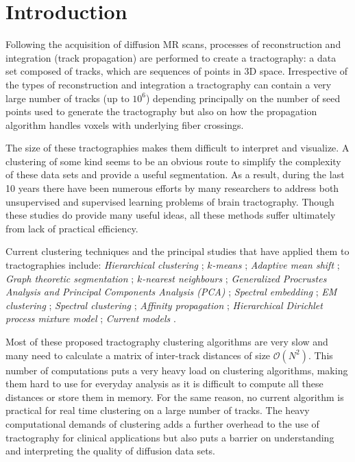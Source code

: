 \documentclass[journal]{IEEEtran}
\begin{document}
\section{Introduction}

Following the acquisition of diffusion MR scans, processes of
reconstruction and integration (track propagation) are performed to
create a tractography: a data set composed of tracks, which are
sequences of points in 3D space. Irrespective of the types of
reconstruction and integration a tractography can contain a very large
number of tracks (up to $10^6$) depending principally on the number of
seed points used to generate the tractography but also on how the
propagation algorithm handles voxels with underlying fiber crossings.

The size of these tractographies makes them difficult to interpret and
visualize. A clustering of some kind seems to be an obvious route to
simplify the complexity of these data sets and provide a useful
segmentation.  As a result, during the last 10 years there have been
numerous efforts by many researchers to address both unsupervised and
supervised learning problems of brain tractography. Though these studies
do provide many useful ideas, all these methods suffer ultimately from
lack of practical efficiency.

Current clustering techniques and the principal studies that have
applied them to tractographies include: \textit{Hierarchical clustering}
\cite{Visser2010, gerig2004analysis, Guevara2010, zhang2005dti,
  jianu2009exploring}; \textit{$k$-means} \cite{ElKouby2005, Tsai2007};
\textit{Adaptive mean shift} \cite{zvitia2008adaptive, Zvitia2010};
\textit{Graph theoretic segmentation} \cite{brun2004clustering};
\textit{$k$-nearest neighbours} \cite{Ding2003a}; \textit{Generalized
  Procrustes Analysis and Principal Components Analysis (PCA)}
\cite{Corouge2004, corouge2004towards, Corouge2006}; \textit{Spectral
  embedding} \cite{ODonnell_IEEETMI07}; \textit{EM clustering}
\cite{Maddah_MICCA2005, maddah2006statistical, Maddah_IEEEBI2008,
  ziyan2009consistency}; \textit{Spectral clustering}
\cite{jonasson2005fiber}; \textit{Affinity propagation}
\cite{leemans17new, malcolm2009filtered}; \textit{Hierarchical Dirichlet
  process mixture model} \cite{wang2010tractography}; \textit{Current
  models} \cite{Durrleman2009, durrleman2010registration}.

Most of these proposed tractography clustering algorithms are very slow and many
need to calculate a matrix of inter-track distances of size $\mathcal{O}(N^2)$.
This number of computations puts a very heavy load on clustering algorithms,
making them hard to use for everyday analysis as it is difficult to compute all
these distances or store them in memory. For the same reason, no current
algorithm is practical for real time clustering on a large number of tracks. The
heavy computational demands of clustering adds a further overhead to the use of
tractography for clinical applications but also puts a barrier on understanding
and interpreting the quality of diffusion data sets.
\end{document}
